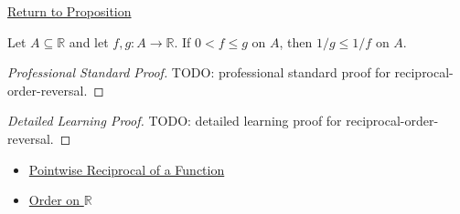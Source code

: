 \newpage
{}
\label{prf:reciprocal-order-reversal}

\begin{remark*}[Return]
\hyperref[prop:reciprocal-order-reversal]{Return to Proposition}
\end{remark*}

\begin{proposition*}
Let \(A\subseteq\mathbb{R}\) and let \(f,g:A\to\mathbb{R}\).  If
\(0<f\leq g\) on \(A\), then \(1/g\leq1/f\) on \(A\).
\end{proposition*}

\begin{proof}[Professional Standard Proof]
\LRAProofBodyStart
TODO: professional standard proof for reciprocal-order-reversal.
\end{proof}

\begin{proof}[Detailed Learning Proof]
\LRAProofBodyStart
TODO: detailed learning proof for reciprocal-order-reversal.
\end{proof}

\begin{remark*}
\end{remark*}

\begin{dependencies}
\begin{itemize}
  \item \hyperref[def:pointwise-reciprocal-of-a-function]{Pointwise Reciprocal of a Function}
  \item \hyperref[def:order-on-r]{Order on \(\mathbb{R}\)}
\end{itemize}
\end{dependencies}

\clearpage
